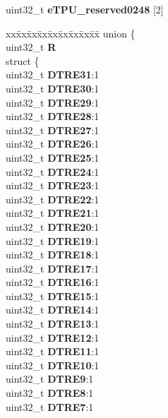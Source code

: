 \begin{DoxyCompactItemize}
\begin{tabbing}
\end{tabbing}\item 
\mbox{\label{structETPU__tag_af39ad00bbaad68d60e5f7c161ce57410}} 
uint32\+\_\+t {\bfseries e\+T\+P\+U\+\_\+reserved0248} \mbox{[}2\mbox{]}
\item 
\mbox{\label{structETPU__tag_a389a5c538ecd364efae0d4400c4cae60}} 
\begin{tabbing}
xx\=xx\=xx\=xx\=xx\=xx\=xx\=xx\=xx\=\kill
union \{\\
\>uint32\_t {\bfseries R}\\
\>struct \{\\
\>\>uint32\_t {\bfseries DTRE31}:1\\
\>\>uint32\_t {\bfseries DTRE30}:1\\
\>\>uint32\_t {\bfseries DTRE29}:1\\
\>\>uint32\_t {\bfseries DTRE28}:1\\
\>\>uint32\_t {\bfseries DTRE27}:1\\
\>\>uint32\_t {\bfseries DTRE26}:1\\
\>\>uint32\_t {\bfseries DTRE25}:1\\
\>\>uint32\_t {\bfseries DTRE24}:1\\
\>\>uint32\_t {\bfseries DTRE23}:1\\
\>\>uint32\_t {\bfseries DTRE22}:1\\
\>\>uint32\_t {\bfseries DTRE21}:1\\
\>\>uint32\_t {\bfseries DTRE20}:1\\
\>\>uint32\_t {\bfseries DTRE19}:1\\
\>\>uint32\_t {\bfseries DTRE18}:1\\
\>\>uint32\_t {\bfseries DTRE17}:1\\
\>\>uint32\_t {\bfseries DTRE16}:1\\
\>\>uint32\_t {\bfseries DTRE15}:1\\
\>\>uint32\_t {\bfseries DTRE14}:1\\
\>\>uint32\_t {\bfseries DTRE13}:1\\
\>\>uint32\_t {\bfseries DTRE12}:1\\
\>\>uint32\_t {\bfseries DTRE11}:1\\
\>\>uint32\_t {\bfseries DTRE10}:1\\
\>\>uint32\_t {\bfseries DTRE9}:1\\
\>\>uint32\_t {\bfseries DTRE8}:1\\
\>\>uint32\_t {\bfseries DTRE7}:1\\

\end{tabbing}
\end{DoxyCompactItemize}
